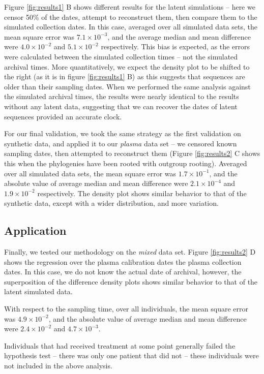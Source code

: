 Figure \ref{fig:results1} B shows different results for the latent simulations -- here we censor 50\% of the dates, attempt to reconstruct them, then compare them to the simulated collection dates. 
In this case, averaged over all simulated data sets, the mean square error was $7.1\times 10^{-3}$, and the average median and mean difference were $4.0\times 10^{-2}$ and $5.1\times 10^{-2}$ respectively. 
This bias is expected, as the errors were calculated between the simulated collection times -- not the simulated archival times.
More quantitatively, we expect the density plot to be shifted to the right (as it is in figure \ref{fig:results1} B) as this suggests that sequences are older than their sampling dates.
When we performed the same analysis against the simulated archival times, the results were nearly identical to the results without any latent data, suggesting that we can recover the dates of latent sequences provided an accurate clock.

For our final validation, we took the same strategy as the first validation on synthetic data, and applied it to our {\em plasma} data set -- we censored known sampling dates, then attempted to reconstruct them (Figure \ref{fig:results2} C shows this when the phylogenies have been rooted with outgroup rooting). 
Averaged over all simulated data sets, the mean square error was $1.7\times 10^{-1}$, and the absolute value of average median and mean difference were $2.1\times 10^{-4}$ and $1.9\times 10^{-2}$ respectively. 
The density plot shows similar behavior to that of the synthetic data, except with a wider distribution, and more variation. 

\subsection * {Application} \label{sec:mixed_data}

Finally, we tested our methodology on the {\em mixed} data set.
Figure \ref{fig:results2} D shows the regression over the plasma calibration dates the plasma collection dates. 
In this case, we do not know the actual date of archival, however, the superposition of the difference density plots shows similar behavior to that of the latent simulated data.

With respect to the sampling time, over all individuals, the mean square error was $4.9\times 10^{-2}$, and the absolute value of average median and mean difference were $2.4\times 10^{-2}$ and $4.7\times 10^{-3}$.

Individuals that had received treatment at some point generally failed the hypothesis test -- there was only one patient that did not -- these individuals were not included in the above analysis. 

